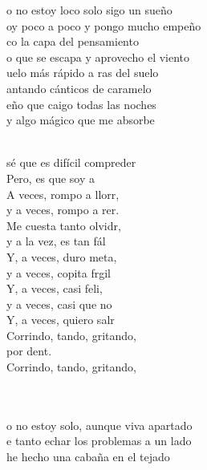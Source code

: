 \begin{cancion}%
	o no estoy loco solo sigo un sueño\\
	oy poco a poco y pongo mucho empeño\\
	co la capa del pensamiento\\
	o que se escapa y aprovecho el viento\\
\jump
	uelo más rápido a ras del suelo\\
	antando cánticos de caramelo\\
	eño que caigo todas las noches\\
	y algo mágico que me absorbe\\\jump\\
	\begin{chorus}%
	 sé que es difícil compreder\\
	Pero, es que soy a \\
	A veces, rompo a llorr, \\
	y a veces, rompo a rer. \\
	Me cuesta tanto olvidr, \\
	y a la vez, es tan fál\\
	Y, a veces, duro meta, \\
	y a veces, copita frgil \\
	Y, a veces, casi feli, \\
	y a veces, casi que no\\
	Y, a veces, quiero salr\\
	Corrindo, tando, gritando, \\
	por dent.\\
	Corrindo, tando, gritando,\\
	\end{chorus}%
	\jump\\
\jump
	       \\
	o no estoy solo, aunque viva apartado\\
	e tanto echar los problemas a un lado\\
	 he hecho una cabaña en el tejado\\

\end{cancion}
